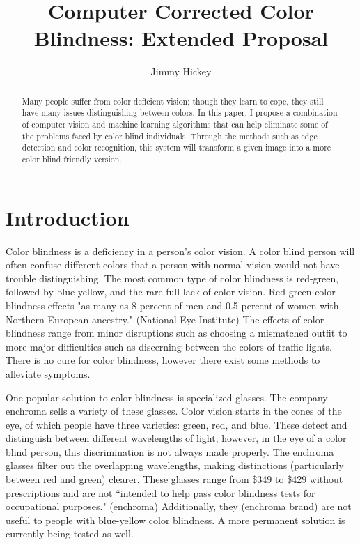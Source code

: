 \documentclass[12pt]{article}
\title{
Computer Corrected Color Blindness: Extended Proposal
}
\author{Jimmy Hickey}
\begin{document}
\maketitle
\doublespacing

\begin{abstract}
Many people suffer from color deficient vision; though they learn to cope, they still have many issues distinguishing between colors. In this paper, I propose a combination of computer vision and machine learning algorithms that can help eliminate some of the problems faced by color blind individuals. Through the methods such as edge detection and color recognition, this system will transform a given image into a more color blind friendly version.
\end{abstract}

\section{Introduction}

Color blindness is a deficiency in a person's color vision. A color blind person will often confuse different colors that a person with normal vision would not have trouble distinguishing. The most common type of color blindness is red-green, followed by blue-yellow, and the rare full lack of color vision. Red-green color blindness effects "as many as 8 percent of men and 0.5 percent of women with Northern European ancestry." (National Eye Institute) The effects of color blindness range from minor disruptions such as choosing a mismatched outfit to more major difficulties such as discerning between the colors of traffic lights.
There is no cure for color blindness, however there exist some methods to alleviate symptoms. 

One popular solution to color blindness is specialized glasses. The company enchroma sells a variety of these glasses. Color vision starts in the cones of the eye, of which people have three varieties: green, red, and blue. These detect and distinguish between different wavelengths of light; however, in the eye of a color blind person, this discrimination is not always made properly. The enchroma glasses filter out the overlapping wavelengths, making distinctions (particularly between red and green) clearer. These glasses range from \$349 to \$429 without prescriptions and are not ``intended to help pass color blindness tests for occupational purposes." (enchroma) Additionally, they (enchroma brand) are not useful to people with blue-yellow color blindness. A more permanent solution is currently being tested as well.
\end{document}

